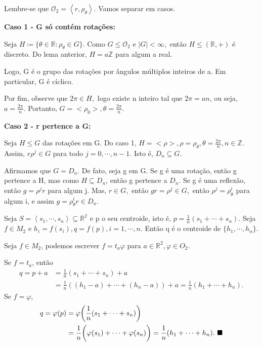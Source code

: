 \documentclass[algebra_notes.tex]{subfiles}
\begin{document}
\begin{proof*}
	Lembre-se que \(\mathcal{O}_{2} = \left< r, \rho _{\theta } \right>\). Vamos separar em casos.

	\textbf{Caso 1 - G só contém rotações:}

	Seja \(H\coloneqq \{\theta \in \mathbb{R}: \rho _{\theta }\in G\}\). Como
	\(G\leq \mathcal{O}_{2}\) e \(|G| < \infty,\) então \(H\leq (\mathbb{R}, +)\)
	é discreto. Do lema anterior, \(H = a \mathbb{Z}\) para algum a real.

	Logo, G é o grupo das rotações por ângulos múltiplos inteiros de a. Em
	particular, G é cíclico.

	Por fim, observe que \(2\pi \in H,\) logo existe n inteiro tal que \(2\pi =an\),
	ou seja, \(a = \frac{2\pi }{n}.\) Portanto, \(G = <\rho_{0}>, \theta =\frac{2\pi }{n}\).

	\textbf{Caso 2 - r pertence a G:}

	Seja \(H\leq G\) das rotações em G. Do caso 1, \(H = <\rho >, \rho = \rho _{\theta }, \theta =\frac{2\pi }{n}, n\in \mathbb{Z}\).
	Assim, \(r\rho^{j}\in G\) para todo \(j=0, \cdots, n-1.\) Isto é, \(D_{n}\subseteq{G}\).

	Afirmamos que \(G=D_{n}\). De fato, seja g em G. Se g é uma rotação, então
	g pertence a H, mas como \(H\subseteq{D_{n}}\), então g pertence a \(D_{n}\).
	Se g é uma reflexão, então \(g=\rho^{j}r\) para algum j. Mas, \(r\in G,\) então
	\(gr = \rho^{j}\in G,\) então \(\rho ^{j}=\rho _{\theta }^{i}\) para algum i,
	e assim \(g=\rho _{\theta }^{i}r\in D_{n}\). \qedsymbol
\end{proof*}
\begin{lemma*}
	Seja \(S = \left< s_{1}, \cdots, s_{n} \right>\subseteq{\mathbb{R^{2}}}\) e
	p o seu centroide, isto é, \(p=\frac{1}{n}(s_{1} + \cdots + s_{n})\). Seja \(f\in M_{2}\)
	e \(h_{i}=f(s_{i}), q=f(p), i = 1,\cdots,n.\) Então q é o centroide de
	\(\{h_{1}, \cdots, h_{n}\}\).
\end{lemma*}
\begin{proof*}
	Seja \(f\in M_{2}\), podemos escrever \(f=t_{a}\varphi \) para \(a\in \mathbb{R}^{2}, \varphi \in O_{2}\).

	Se \(f=t_{a}\), então
	\begin{align*}
		q = p + a & =\frac{1}{n}(s_{1}+\cdots+s_{n})+a                                              \\
		          & =\frac{1}{n}((h_{1}-a)+\cdots+(h_{n}-a)) + a = \frac{1}{n}(h_{1}+\cdots+h_{n}).
	\end{align*}
	Se \(f=\varphi \),
	\begin{align*}
		q = \varphi (p) & = \varphi \biggl(\frac{1}{n}(s_{1}+\cdots+s_{n})\biggr)                                                               \\
		                & =\frac{1}{n}\biggl(\varphi (s_{1})+\cdots+\varphi (s_{n})\biggr) = \frac{1}{n}(h_{1}+\cdots+h_{n}).\text{ $\blacksquare$}
	\end{align*}
\end{proof*}
\end{document}
